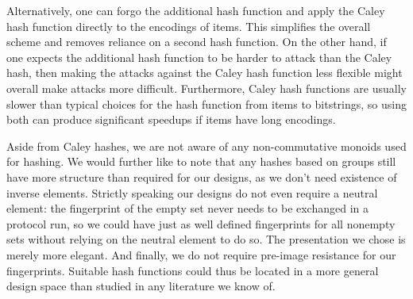 Alternatively, one can forgo the additional hash function and apply the Caley hash function directly to the encodings of items. This simplifies the overall scheme and removes reliance on a second hash function. On the other hand, if one expects the additional hash function to be harder to attack than the Caley hash, then making the attacks against the Caley hash function less flexible might overall make attacks more difficult. Furthermore, Caley hash functions are usually slower than typical choices for the hash function from items to bitstrings, so using both can produce significant speedups if items have long encodings.

Aside from Caley hashes, we are not aware of any non-commutative monoids used for hashing. We would further like to note that any hashes based on groups still have more structure than required for our designs, as we don't need existence of inverse elements. Strictly speaking our designs do not even require a neutral element: the fingerprint of the empty set never needs to be exchanged in a protocol run, so we could have just as well defined fingerprints for all nonempty sets without relying on the neutral element to do so. The presentation we chose is merely more elegant. And finally, we do not require pre-image resistance for our fingerprints. Suitable hash functions could thus be located in a more general design space than studied in any literature we know of.
